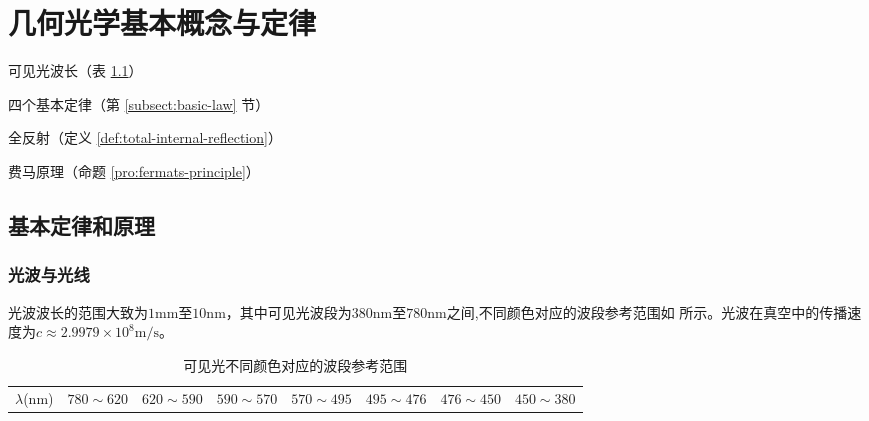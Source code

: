 \chapter{几何光学基本概念与定律}

\begin{introduction}
	\item 可见光波长（表 \ref{tab:visible-light}）
	\item 四个基本定律（第 \ref{subsect:basic-law} 节）
	\item 全反射（定义 \ref{def:total-internal-reflection}）
	\item 费马原理（命题 \ref{pro:fermats-principle}）
\end{introduction}

\section{基本定律和原理}

\subsection{光波与光线}
光波波长的范围大致为$1\mathrm{mm}$至$10\mathrm{nm}$，其中可见光波段为$380\mathrm{nm}$至$780\mathrm{nm}$之间,不同颜色对应的波段参考范围如 所示。光波在真空中的传播速度为$c\approx 2.9979\times 10^8\mathrm{m/s}$。

\begin{table}[htbp]
	\small
	\caption{可见光不同颜色对应的波段参考范围}
	\centering
	\begin{tabular}{cccccccc}
		\toprule
		&\color{red}{红色}&\color{orange}{橙色}&\color{yellow}{黄色}&\color{green}{绿色}&\color{cyan}{青色}&\color{blue}{蓝色}&\color{violet}{紫色}\\
		\midrule
		$\lambda$(nm)&$780\sim620$&$620\sim590$&$590\sim570$&$570\sim495$&$495\sim476$&$476\sim450$&$450\sim380$\\
		\bottomrule
	\end{tabular}
	\label{tab:visible-light}
\end{table}

